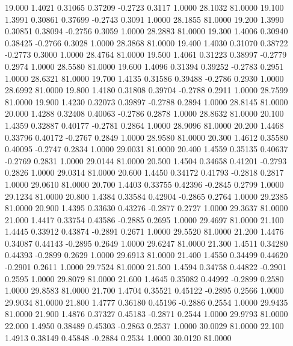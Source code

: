   19.000   1.4021   0.31065   0.37209  -0.2723   0.3117   1.0000  28.1032  81.0000
  19.100   1.3991   0.30861   0.37699  -0.2743   0.3091   1.0000  28.1855  81.0000
  19.200   1.3990   0.30851   0.38094  -0.2756   0.3059   1.0000  28.2883  81.0000
  19.300   1.4006   0.30940   0.38425  -0.2766   0.3028   1.0000  28.3868  81.0000
  19.400   1.4030   0.31070   0.38722  -0.2773   0.3000   1.0000  28.4764  81.0000
  19.500   1.4061   0.31223   0.38997  -0.2779   0.2974   1.0000  28.5580  81.0000
  19.600   1.4096   0.31394   0.39252  -0.2783   0.2951   1.0000  28.6321  81.0000
  19.700   1.4135   0.31586   0.39488  -0.2786   0.2930   1.0000  28.6992  81.0000
  19.800   1.4180   0.31808   0.39704  -0.2788   0.2911   1.0000  28.7599  81.0000
  19.900   1.4230   0.32073   0.39897  -0.2788   0.2894   1.0000  28.8145  81.0000
  20.000   1.4288   0.32408   0.40063  -0.2786   0.2878   1.0000  28.8632  81.0000
  20.100   1.4359   0.32887   0.40177  -0.2781   0.2864   1.0000  28.9096  81.0000
  20.200   1.4468   0.33796   0.40172  -0.2767   0.2849   1.0000  28.9580  81.0000
  20.300   1.4612   0.35580   0.40095  -0.2747   0.2834   1.0000  29.0031  81.0000
  20.400   1.4559   0.35135   0.40637  -0.2769   0.2831   1.0000  29.0144  81.0000
  20.500   1.4504   0.34658   0.41201  -0.2793   0.2826   1.0000  29.0314  81.0000
  20.600   1.4450   0.34172   0.41793  -0.2818   0.2817   1.0000  29.0610  81.0000
  20.700   1.4403   0.33755   0.42396  -0.2845   0.2799   1.0000  29.1234  81.0000
  20.800   1.4384   0.33584   0.42904  -0.2865   0.2764   1.0000  29.2385  81.0000
  20.900   1.4395   0.33630   0.43276  -0.2877   0.2727   1.0000  29.3637  81.0000
  21.000   1.4417   0.33754   0.43586  -0.2885   0.2695   1.0000  29.4697  81.0000
  21.100   1.4445   0.33912   0.43874  -0.2891   0.2671   1.0000  29.5520  81.0000
  21.200   1.4476   0.34087   0.44143  -0.2895   0.2649   1.0000  29.6247  81.0000
  21.300   1.4511   0.34280   0.44393  -0.2899   0.2629   1.0000  29.6913  81.0000
  21.400   1.4550   0.34499   0.44620  -0.2901   0.2611   1.0000  29.7524  81.0000
  21.500   1.4594   0.34758   0.44822  -0.2901   0.2595   1.0000  29.8079  81.0000
  21.600   1.4645   0.35082   0.44992  -0.2899   0.2580   1.0000  29.8583  81.0000
  21.700   1.4704   0.35521   0.45122  -0.2895   0.2566   1.0000  29.9034  81.0000
  21.800   1.4777   0.36180   0.45196  -0.2886   0.2554   1.0000  29.9435  81.0000
  21.900   1.4876   0.37327   0.45183  -0.2871   0.2544   1.0000  29.9793  81.0000
  22.000   1.4950   0.38489   0.45303  -0.2863   0.2537   1.0000  30.0029  81.0000
  22.100   1.4913   0.38149   0.45848  -0.2884   0.2534   1.0000  30.0120  81.0000
